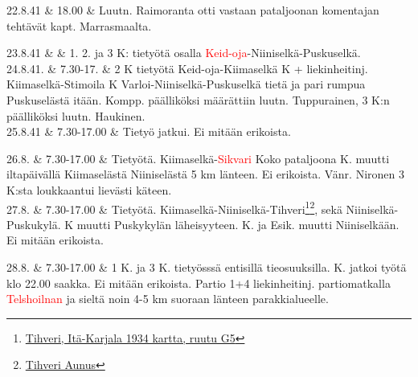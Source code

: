 \documentclass[11pt,a5paper,oneside]{book}
\begin{document}
22.8.41 & 18.00 & Luutn. Raimoranta otti vastaan pataljoonan komentajan tehtävät kapt. Marrasmaalta. \\
\newpage

23.8.41 & & 1. 2. ja 3 K: tietyötä osalla \textcolor{red}{Keid-oja}-Niiniselkä-Puskuselkä. \newline\newline \\

24.8.41. & 7.30-17. & 2 K tietyötä Keid-oja-Kiimaselkä  K + liekinheitinj. Kiimaselkä-Stimoila  K Varloi-Niiniselkä-Puskuselkä tietä ja pari rumpua Puskuselästä itään.  Kompp. päälliköksi määrättiin luutn. Tuppurainen, 3 K:n päälliköksi luutn. Haukinen. \newline \\

25.8.41 & 7.30-17.00 & Tietyö jatkui. Ei mitään erikoista. \\

\taulustop


26.8. & 7.30-17.00 & Tietyötä. Kiimaselkä-\textcolor{red}{Sikvari} \newline Koko pataljoona  K. muutti iltapäivällä Kiimaselästä Niiniselästä 5 km länteen. \newline Ei erikoista. Vänr. Nironen 3 K:sta loukkaantui lievästi käteen. \newline\newline \\

27.8. & 7.30-17.00 & Tietyötä. Kiimaselkä-Niiniselkä-Tihveri\footnote{\href{https://www.google.fi/maps/place/61\%C2\%B020'14.6\%22N+32\%C2\%B052'39.7\%22E/@61.337376,32.8755083,903m/}{Tihveri, Itä-Karjala 1934 kartta, ruutu G5}}\footnote{\href{https://www.sotahistoriallisetkohteet.fi/app/sights/view/-/id/1175/country/9/area/90/s_back/1}{Tihveri Aunus}}, sekä Niiniselkä-Puskukylä.  K muutti Puskykylän läheisyyteen.  K. ja Esik. muutti Niiniselkään. \newline Ei mitään erikoista. \\
\newpage

28.8. & 7.30-17.00 & 1 K. ja 3 K. tietyösssä entisillä tieosuuksilla.  K. jatkoi työtä klo 22.00 saakka. Ei mitään erikoista. \newline Partio 1+4 liekinheitinj. partiomatkalla \textcolor{red}{Telshoilnan} ja sieltä noin 4-5 km suoraan länteen parakkialueelle. \newline\newline\newline \\
\end{document}
